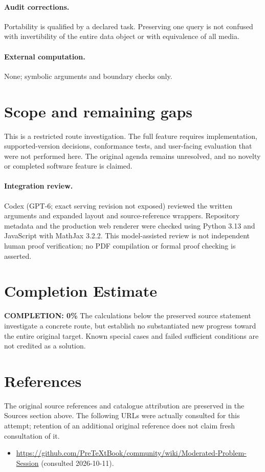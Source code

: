 \documentclass[11pt]{article}
\begin{document}
\paragraph{Audit corrections.} Portability is qualified by a declared task. Preserving one query is not confused with invertibility of the entire data object or with equivalence of all media.
\paragraph{External computation.} None; symbolic arguments and boundary checks only.
\section{Scope and remaining gaps}
This is a restricted route investigation. The full feature requires implementation, supported-version decisions, conformance tests, and user-facing evaluation that were not performed here. The original agenda remains unresolved, and no novelty or completed software feature is claimed.
\paragraph{Integration review.} Codex (GPT-6; exact serving revision not exposed) reviewed the written arguments and expanded layout and source-reference wrappers. Repository metadata and the production web renderer were checked using Python 3.13 and JavaScript with MathJax 3.2.2. This model-assisted review is not independent human proof verification; no PDF compilation or formal proof checking is asserted.

\section{Completion Estimate}
\noindent\textbf{COMPLETION: 0\%}
The calculations below the preserved source statement investigate a concrete route,
but establish no substantiated new progress toward the entire original target.
Known special cases and failed sufficient conditions are not credited as a solution.
\section{References}
The original source references and catalogue attribution are preserved in the
Sources section above. The following URLs were actually consulted for this attempt;
retention of an additional original reference does not claim fresh consultation of it.
\begin{itemize}
\item \url{https://github.com/PreTeXtBook/community/wiki/Moderated-Problem-Session} (consulted 2026-10-11). 
\end{itemize}
\end{document}
